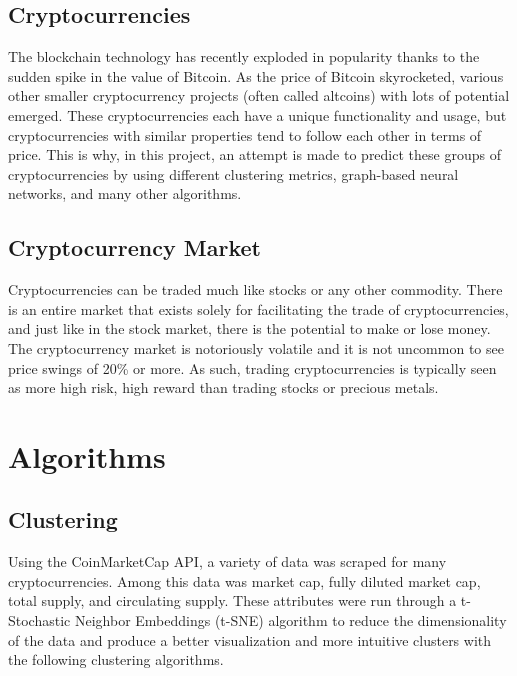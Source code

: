 \documentclass[11pt]{article}
\newcommand{\np}{\newpage}
\begin{document}
\subsection{Cryptocurrencies}
The blockchain technology has recently exploded in popularity thanks to the sudden spike in the value of Bitcoin. As the price of Bitcoin skyrocketed, various other smaller cryptocurrency projects (often called altcoins) with lots of potential emerged. These cryptocurrencies each have a unique functionality and usage, but cryptocurrencies with similar properties tend to follow each other in terms of price. This is why, in this project, an attempt is made to predict these groups of cryptocurrencies by using different clustering metrics, graph-based neural networks, and many other algorithms.

\subsection{Cryptocurrency Market}
Cryptocurrencies can be traded much like stocks or any other commodity.  There is an entire market that exists solely for facilitating the trade of cryptocurrencies, and just like in the stock market, there is the potential to make or lose money.\\[2mm]
The cryptocurrency market is notoriously volatile and it is not uncommon to see price swings of 20\% or more.  As such, trading cryptocurrencies is typically seen as more high risk, high reward than trading stocks or precious metals.\\[2mm]


\section{Algorithms}
\subsection{Clustering}
Using the CoinMarketCap API, a variety of data was scraped for many cryptocurrencies.  Among this data was market cap, fully diluted market cap, total supply, and circulating supply.  These attributes were run through a t-Stochastic Neighbor Embeddings (t-SNE) algorithm to reduce the dimensionality of the data and produce a better visualization and more intuitive clusters with the following clustering algorithms.
\np
\end{document}
